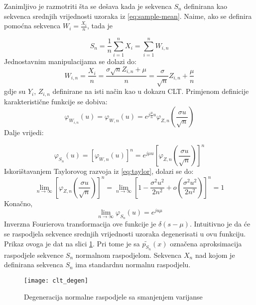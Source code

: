 Zanimljivo je razmotriti šta se dešava kada je sekvenca $S_n$ definirana kao
sekvenca srednjih vrijednosti uzoraka iz \eqref{eq:sample-mean}. Naime, ako se
definira pomoćna sekvenca $W_i = \frac{X_i}{n}$, tada je

\begin{equation}
  S_n = \frac{1}{n}\sum_{i=1}^{n} X_i = \sum_{i=1}^{n} W_{i,n}
\end{equation}
%
Jednostavnim manipulacijama se dolazi do:
\begin{equation}
  W_{i,n} = \frac{X_i}{n} = \frac{\sigma \sqrt{n} Z_{i,n}+\mu}{n}
  = \frac{\sigma}{\sqrt{n}} Z_{i,n} + \frac{\mu}{n}
\end{equation}
gdje su $Y_i$, $Z_{i,n}$ definirane na isti način kao u dokazu CLT.
%
Primjenom definicije karakteristične funkcije se dobiva:
\begin{equation}
  \varphi_{W_{i,n}}(u) = \varphi_{W,n}(u)
  = e^{j\frac{\mu}{n} u} \varphi_{Z,n}\left(\frac{\sigma u}{\sqrt{n}}\right)
\end{equation}
%
Dalje vrijedi:

\begin{equation}
  \varphi_{S_n}(u) = [\varphi_{W,n}(u)]^n
  = e^{j\mu u} \left[\varphi_{Z,n}\left(\frac{\sigma u}{\sqrt{n}}\right)\right]^n
\end{equation}
%
Iskorištavanjem Taylorovog razvoja iz \eqref{eq:taylor}, dolazi se do:
\begin{equation}
  \lim_{n\to\infty}
    \left[\varphi_{Z,n}\left(\frac{\sigma u}{\sqrt{n}}\right)\right]^n
    = \lim_{n\to\infty} \left[1-\frac{\sigma^2u^2}{2n^2} +
      o\left(\frac{\sigma^2u^2}{2n^2}\right)\right]^n
    = 1
\end{equation}
Konačno,
\begin{equation}
  \lim_{n\to\infty} \varphi_{S_n}(u) = e^{ju\mu}
\end{equation}
Inverzna Fourierova transformacija ove funkcije je $\delta(s-\mu)$. Intuitivno
je da će se raspodjela sekvence srednjih vrijednosti uzoraka degenerisati u ovu
funkciju. Prikaz ovoga je dat na slici \ref{fig:clt-degen}. Pri tome je sa
$\widetilde{p_{S_n}}(x)$ označena aproksimacija raspodjele sekvence $S_n$
normalnom raspodjelom. Sekvenca $X_n$ nad kojom je definirana sekvenca $S_n$ ima
standardnu normalnu raspodjelu.

\begin{figure}[H]
  \centering
  \texttt{[image: clt\_degen]}
	\caption{Degeneracija normalne raspodjele sa smanjenjem varijanse}
  \label{fig:clt-degen}
\end{figure}

